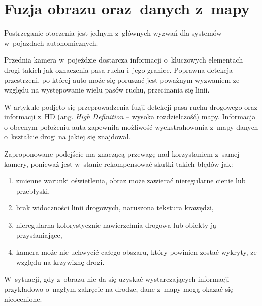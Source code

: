 \section{Fuzja obrazu oraz~danych z~mapy}

Postrzeganie otoczenia jest jednym z~głównych wyzwań dla systemów w~pojazdach autonomicznych. 

Przednia kamera w~pojeździe dostarcza informacji o~kluczowych elementach drogi takich jak oznaczenia pasa ruchu i~jego granice. 
Poprawna detekcja przestrzeni, po której auto może się poruszać jest poważnym wyzwaniem ze względu na występowanie wielu pasów ruchu, przecinania się linii.

W artykule \cite{hdmap} podjęto się przeprowadzenia fuzji detekcji pasa ruchu drogowego oraz informacji z~HD (ang. \textit{High Definition} -- wysoka rozdzielczość) mapy. 
Informacja o obecnym położeniu auta zapewniła możliwość wyekstrahowania z~mapy danych o~kształcie drogi na jakiej się znajdował.

Zaproponowane podejście ma znaczącą przewagę nad korzystaniem z~samej kamery, ponieważ jest w~stanie rekompensować skutki takich błędów jak: 
\begin{enumerate}
	\item zmienne warunki oświetlenia, obraz może zawierać nieregularne cienie lub przebłyski,
	\item brak widoczności linii drogowych, naruszona tekstura krawędzi,
	\item nieregularna kolorystycznie nawierzchnia drogowa lub  obiekty ją przysłaniające,
	\item kamera może nie uchwycić całego obszaru, który powinien zostać wykryty, ze względu na krzywiznę drogi.
\end{enumerate}
W~sytuacji, gdy z~obrazu nie da się uzyskać wystarczających informacji przykładowo o~nagłym zakręcie na drodze, dane z~mapy mogą okazać się nieocenione.
